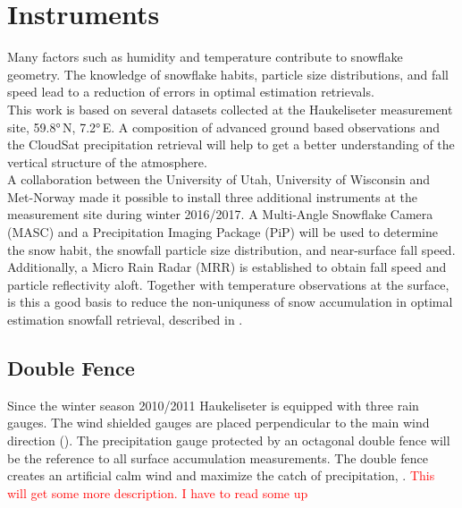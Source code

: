 \section{Instruments} \label{sec:DIM}


Many factors such as humidity and temperature contribute to snowflake geometry. The knowledge of snowflake habits, particle size distributions, and fall speed lead to a reduction of errors in optimal estimation retrievals. \\
This work is based on several datasets collected at the Haukeliseter measurement site, \ang{59.8}\,N, \ang{7.2}\,E. A composition of advanced ground based observations and the CloudSat precipitation retrieval will help to get a better understanding of the vertical structure of the atmosphere. 
\\
A collaboration between the University of Utah, University of Wisconsin and Met-Norway made it possible to install three additional instruments at the measurement site during winter 2016/2017. A Multi-Angle Snowflake Camera (MASC) and a Precipitation Imaging Package (PiP) will be used to determine the snow habit, the snowfall particle size distribution, and near-surface fall speed. Additionally, a Micro Rain Radar (MRR) is established to obtain fall speed and particle reflectivity aloft. Together with temperature observations at the surface, is this a good basis to reduce the non-uniquness of snow accumulation in optimal estimation snowfall retrieval, described in . 
%
%
\subsection{Double Fence}

Since the winter season 2010/2011 Haukeliseter is equipped with three rain gauges. The wind shielded gauges are placed perpendicular to the main wind direction (). The precipitation gauge protected by an octagonal double fence will be the reference to all surface accumulation measurements. The double fence creates an artificial calm wind and maximize the catch of precipitation, \citep{wolff_new_2010, wolff_measurements_2013, wolff_derivation_2015}. \textcolor{red}{This will get some more description. I have to read some up}
%

